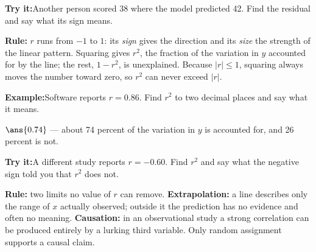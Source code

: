 \documentclass[12pt]{article}
\begin{document}
\begin{tryitbox}
\textbf{Try it:}\quad Another person scored 38 where the model predicted 42.
Find the residual and say what its sign means.\\[2pt]
\end{tryitbox}


\begin{formulabox}
\textbf{Rule:} $r$ runs from $-1$ to $1$: its \emph{sign} gives the direction and
its \emph{size} the strength of the linear pattern. Squaring gives
$r^2$, the fraction of the variation in $y$ accounted for by the line; the rest,
$1 - r^2$, is unexplained. Because $|r| \le 1$, squaring always moves the number
toward zero, so $r^2$ can never exceed $|r|$.
\end{formulabox}

\begin{examplebox}
\textbf{Example:}\quad Software reports $r = 0.86$. Find $r^2$ to two decimal
places and say what it means.

$\ans{0.74}$ --- about 74 percent of the variation in $y$ is accounted for, and
26 percent is not.
\end{examplebox}

\begin{tryitbox}
\textbf{Try it:}\quad A different study reports $r = -0.60$. Find $r^2$ and say
what the negative sign told you that $r^2$ does not.\\[2pt]
\end{tryitbox}


\begin{formulabox}
\textbf{Rule:} two limits no value of $r$ can remove.
\textbf{Extrapolation:} a line describes only the range of $x$ actually
observed; outside it the prediction has no evidence and often no meaning.
\textbf{Causation:} in an observational study a strong correlation can be
produced entirely by a lurking third variable. Only random assignment supports
a causal claim.
\end{formulabox}
\end{document}
